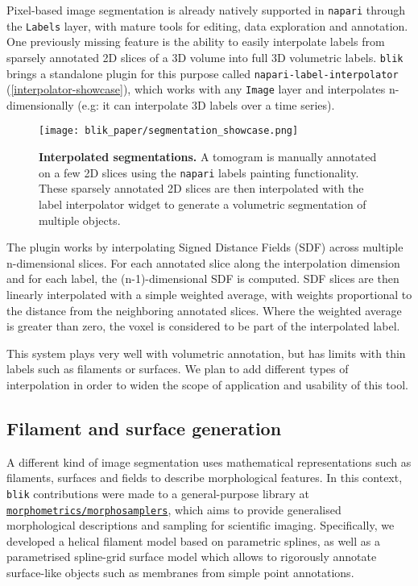 Pixel-based image segmentation is already natively supported in \texttt{napari} through the \texttt{Labels} layer, with mature tools for editing, data exploration and annotation. One previously missing feature is the ability to easily interpolate labels from sparsely annotated 2D slices of a 3D volume into full 3D volumetric labels. \texttt{blik} brings a standalone plugin for this purpose called \texttt{napari-label-interpolator} (\autoref{interpolator-showcase}), which works with any \texttt{Image} layer and interpolates n-dimensionally (e.g: it can interpolate 3D labels over a time series).

\begin{figure}[!ht]
    \centering
    \texttt{[image: blik\_paper/segmentation\_showcase.png]}
    \caption[Interpolated segmentations]{\textbf{Interpolated segmentations.} A tomogram is manually annotated on a few 2D slices using the \texttt{napari} labels painting functionality. These sparsely annotated 2D slices are then interpolated with the label interpolator widget to generate a volumetric segmentation of multiple objects.}
    \label{interpolator-showcase}
\end{figure}

The plugin works by interpolating Signed Distance Fields (SDF) across multiple n-dimensional slices. For each annotated slice along the interpolation dimension and for each label, the (n-1)-dimensional SDF is computed. SDF slices are then linearly interpolated with a simple weighted average, with weights proportional to the distance from the neighboring annotated slices. Where the weighted average is greater than zero, the voxel is considered to be part of the interpolated label.

This system plays very well with volumetric annotation, but has limits with thin labels such as filaments or surfaces. We plan to add different types of interpolation in order to widen the scope of application and usability of this tool.

\subsection{Filament and surface generation}\label{filament-and-surface-generation}

A different kind of image segmentation uses mathematical representations such as filaments, surfaces and fields to describe morphological features. In this context, \texttt{blik} contributions were made to a general-purpose library at \href{https://github.com/morphometrics/morphosamplers}{\texttt{morphometrics/morphosamplers}}, which aims to provide generalised morphological descriptions and sampling for scientific imaging. Specifically, we developed a helical filament model based on parametric splines, as well as a parametrised spline-grid surface model which allows to rigorously annotate surface-like objects such as membranes from simple point annotations.

